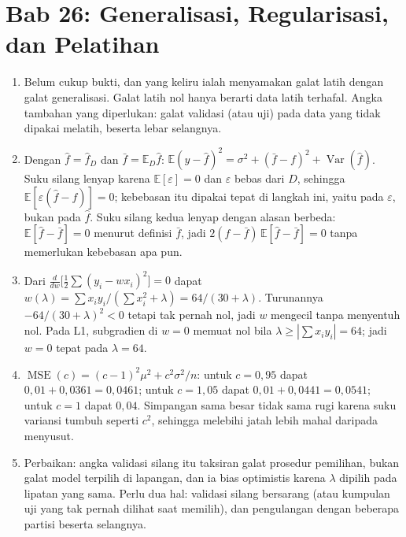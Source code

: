 \section*{Bab 26: Generalisasi, Regularisasi, dan Pelatihan}
\begin{enumerate}[label=\textbf{26.\arabic*}]
  \item Belum cukup bukti, dan yang keliru ialah menyamakan galat latih dengan
        galat generalisasi. Galat latih nol hanya berarti data latih terhafal. Angka
        tambahan yang diperlukan: galat validasi (atau uji) pada data yang tidak
        dipakai melatih, beserta lebar selangnya.

  \item Dengan $\hat f=\hat f_{D}$ dan $\bar f=\mathbb{E}_{D}\hat f$:
        $\mathbb{E}(y-\hat f)^{2}=\sigma^{2}+(\bar f-f)^{2}+\operatorname{Var}(\hat f)$.
        Suku silang lenyap karena $\mathbb{E}[\varepsilon]=0$ dan $\varepsilon$
        bebas dari $D$, sehingga $\mathbb{E}[\varepsilon(\hat f-f)]=0$; kebebasan
        itu dipakai tepat di langkah ini, yaitu pada $\varepsilon$, bukan pada
        $\hat f$. Suku silang kedua lenyap dengan alasan berbeda:
        $\mathbb{E}[\hat f-\bar f]=0$ menurut definisi $\bar f$, jadi
        $2(f-\bar f)\,\mathbb{E}[\hat f-\bar f]=0$ tanpa memerlukan kebebasan apa pun.

  \item Dari $\frac{d}{dw}\bigl[\frac12\sum(y_{i}-wx_{i})^{2}\bigr]=0$ dapat
        $w(\lambda)=\sum x_{i}y_{i}/(\sum x_{i}^{2}+\lambda)=64/(30+\lambda)$.
        Turunannya $-64/(30+\lambda)^{2}<0$ tetapi tak pernah nol, jadi $w$ mengecil
        tanpa menyentuh nol. Pada L1, subgradien di $w=0$ memuat nol bila
        $\lambda\ge|\sum x_{i}y_{i}|=64$; jadi $w=0$ tepat pada $\lambda=64$.

  \item $\operatorname{MSE}(c)=(c-1)^{2}\mu^{2}+c^{2}\sigma^{2}/n$: untuk
        $c=0{,}95$ dapat $0{,}01+0{,}0361=0{,}0461$; untuk $c=1{,}05$ dapat
        $0{,}01+0{,}0441=0{,}0541$; untuk $c=1$ dapat $0{,}04$. Simpangan sama besar
        tidak sama rugi karena suku variansi tumbuh seperti $c^{2}$, sehingga
        melebihi jatah lebih mahal daripada menyusut.

  \item Perbaikan: angka validasi silang itu taksiran galat prosedur pemilihan,
        bukan galat model terpilih di lapangan, dan ia bias optimistis karena
        $\lambda$ dipilih pada lipatan yang sama. Perlu dua hal: validasi silang
        bersarang (atau kumpulan uji yang tak pernah dilihat saat memilih), dan
        pengulangan dengan beberapa partisi beserta selangnya.


\end{enumerate}
